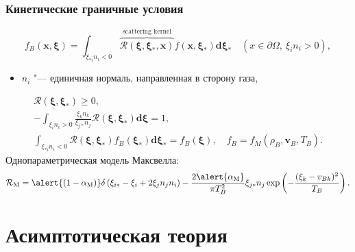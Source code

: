 \documentclass[mathserif]{beamer} %
\newcommand{\dd}{d}%
\newcommand{\dxi}{\boldsymbol{\dd\xi}}
\newcommand{\bxi}{\boldsymbol{\xi}}
\newcommand{\bv}{\boldsymbol{v}}
\newcommand{\bx}{\boldsymbol{x}}
\begin{document}
\begin{frame}
    \frametitle{Кинетические граничные условия}
    \vspace{-10pt}
    \begin{equation*}
        f_B(\bx,\bxi) = \int_{\xi_{*i}n_i<0} \overbrace{\mathcal{R}(\bxi,\bxi_*,\bx)}^\text{scattering kernel}f(\bx,\bxi_*)\dxi_*
        \quad \left( x\in\partial\Omega,\:\xi_in_i>0 \right),
    \end{equation*}
    \vspace{-10pt}
    \begin{itemize}
        \item \(n_i\) "--- единичная нормаль, направленная в сторону газа,
    \end{itemize}
    \begin{gather*}
        \mathcal{R}(\bxi,\bxi_*) \geq 0, \\ %
        -\int_{\xi_in_i>0} \frac{\xi_kn_k}{\xi_{j*}n_j}
            \mathcal{R}(\bxi,\bxi_*)\dxi = 1, \\ %
        \int_{\xi_{*i}n_i<0} \mathcal{R}(\bxi,\bxi_*)f_B(\bxi_*)\dxi_* = f_B(\bxi),
            \quad f_B = f_M(\rho_B, \bv_B, T_B). %
    \end{gather*}
    Однопараметрическая модель Максвелла:
    \begin{equation*}
            \mathcal{R}_\mathrm{M} = \alert{(1-\alpha_\mathrm{M})}\delta\left( \xi_{i*} - \xi_i + 2\xi_jn_jn_i \right)
            -\frac{2\alert{\alpha_\mathrm{M}}}{\pi T_B^2} \xi_{j*}n_j \exp\left( -\frac{(\xi_k-v_{Bk})^2}{T_B} \right).
    \end{equation*}
\end{frame}

\section{Асимптотическая теория}
\end{document}
